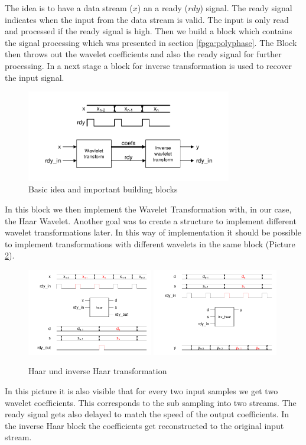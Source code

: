 \begin{refsection}
The idea is to have a data stream ($x$) an a ready ($rdy$) signal. The ready signal indicates when the input from the data stream is valid. The input is only read and processed if the ready signal is high. Then we build a block which contains the signal processing which was presented in section \ref{fpga:polyphase}. The Block then throws out the wavelet coefficients and also the ready signal for further processing. In a next stage a block for inverse transformation is used to recover the input signal.

\begin{figure}
	\centering
	\includegraphics[width=0.8\textwidth]{images/idea.pdf}
	\caption{Basic idea and important building blocks \label{fpga:idea}}
\end{figure}
In this block we then implement the Wavelet Transformation with, in our case, the Haar Wavelet. Another goal was to create a structure to implement different wavelet transformations later. In this way of implementation  it should be possible to implement transformations with different wavelets in the same block (Picture \ref{fpga:haar_inv_haar}). 
\begin{figure}[h]
	\includegraphics[width=0.49\textwidth]{images/haar.pdf}
	\includegraphics[width=0.49\textwidth]{images/inv_haar.pdf}
	\caption{Haar und inverse Haar transformation \label{fpga:haar_inv_haar}}
\end{figure}
In this picture it is also visible that for every two input samples we get two wavelet coefficients. This corresponds to the sub sampling into two streams. The ready signal gets also delayed to match the speed of the output coefficients. In the inverse Haar block the coefficients get reconstructed to the original input stream.


\end{refsection}
